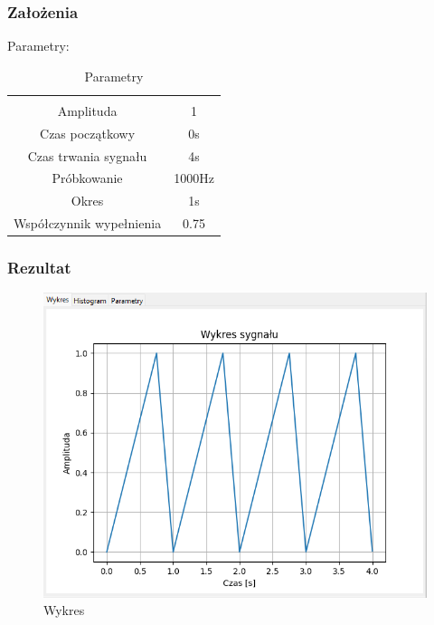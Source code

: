 \documentclass{article}
\begin{document}
\subsubsection{Założenia}
\noindent
Parametry:
\begin{table}[h!]
    \centering
    \vspace{0.2cm}
    \begin{tabular}{|c|c|}
        \hline\hline\\[-0.4cm]
        Amplituda & 1  \\
        \hline
        Czas początkowy & 0s  \\
        \hline
        Czas trwania sygnału & 4s  \\
        \hline
        Próbkowanie & 1000Hz \\
        \hline
        Okres & 1s\\
        \hline
        Współczynnik wypełnienia & 0.75\\
        \hline
    \end{tabular}
    \caption{Parametry}
    \label{trojkat}
\end{table}
\subsubsection{Rezultat}
\begin{figure}[h!]
    \centering
    \includegraphics[width=\textwidth]{img/trojkat/wykres.png}
    \caption{Wykres}
\end{figure}
\end{document}
